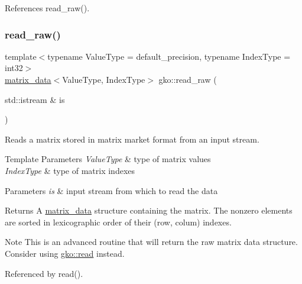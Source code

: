 References read\+\_\+raw().

\mbox{\label{namespacegko_a0b476e0e3df616b08efe85000bff8da0}} 
\subsubsection{\texorpdfstring{read\+\_\+raw()}{read\_raw()}}
{\footnotesize\ttfamily template$<$typename Value\+Type  = default\+\_\+precision, typename Index\+Type  = int32$>$ \\
\hyperlink{structgko_1_1matrix__data}{matrix\+\_\+data}$<$Value\+Type, Index\+Type$>$ gko\+::read\+\_\+raw (\begin{DoxyParamCaption}\item[{std\+::istream \&}]{is }\end{DoxyParamCaption})}



Reads a matrix stored in matrix market format from an input stream. 


\begin{DoxyTemplParams}{Template Parameters}
{\em Value\+Type} & type of matrix values \\
\hline
{\em Index\+Type} & type of matrix indexes\\
\hline
\end{DoxyTemplParams}

\begin{DoxyParams}{Parameters}
{\em is} & input stream from which to read the data\\
\hline
\end{DoxyParams}
\begin{DoxyReturn}{Returns}
A \hyperlink{structgko_1_1matrix__data}{matrix\+\_\+data} structure containing the matrix. The nonzero elements are sorted in lexicographic order of their (row, colum) indexes.
\end{DoxyReturn}
\begin{DoxyNote}{Note}
This is an advanced routine that will return the raw matrix data structure. Consider using \hyperlink{namespacegko_a92cf0178c1c55419d32d2bb527e57e5b}{gko\+::read} instead. 
\end{DoxyNote}


Referenced by read().

\mbox{\label{namespacegko_ae23cfd886cee6e88d77bcbbbe1928b78}} 
